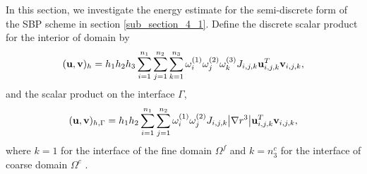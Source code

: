 \documentclass[a4paper]{article}
\begin{document}

In this section, we investigate the energy estimate for the semi-discrete form of the SBP scheme in section \ref{sub_section_4_1}. Define the discrete scalar product for the interior of domain by
\begin{equation}\label{scalar_product_discrete_interior}
({\bf u}, {\bf v})_h = h_1h_2h_3\sum_{i=1}^{n_1}\sum_{j=1}^{n_2}\sum_{k=1}^{n_3}\omega_i^{(1)}\omega_j^{(2)}\omega_k^{(3)}J_{i,j,k}{\bf u}^{T}_{i,j,k}{\bf v}_{i,j,k},
\end{equation}
and the scalar product on the interface $\Gamma$,
\begin{equation}\label{scalar_product_discrete_interface}
({\bf u}, {\bf v})_{h,\Gamma} = h_1h_2\sum_{i=1}^{n_1}\sum_{j=1}^{n_2}\omega_i^{(1)}\omega_j^{(2)}J_{i,j,k}\big|\nabla r^{3}\big|{\bf u}_{i,j,k}^{T}{\bf v}_{i,j,k},
\end{equation}
where $k = 1$ for the interface of the fine domain $\Omega^f$ and $k = n_3^c$ for the interface of coarse domain $\Omega^c$ .
\end{document}
